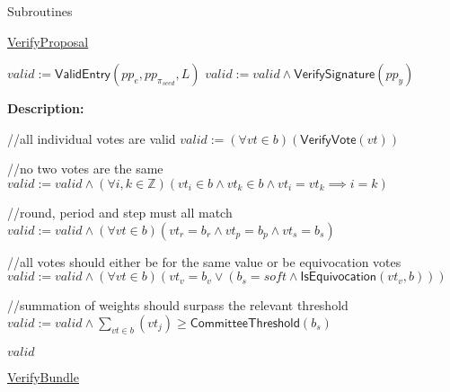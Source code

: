 \documentclass[10pt,a4paper]{article}
\begin{document}
\begin{section}{Subroutines}
\begin{algorithm}[H]
    \caption{\underline{VerifyProposal}}
    \label{algo:verify-proposal}
    \begin{algorithmic}[1]

    \State $valid := \mathsf{ValidEntry}(pp_e, pp_{\pi_{seed}}, L)$
    \State $valid := valid \land \mathsf{VerifySignature}(pp_y)$

    \EndFunction
    \end{algorithmic}
\end{algorithm}

\noindent \textbf{Description:}\\


\begin{algorithm}[H]\label{algo:verify-bundle}
    \begin{algorithmic}[1]

    //all individual votes are valid
    \State $valid := (\forall vt \in b)(\mathsf{VerifyVote}(vt))$
    
    //no two votes are the same
    \State $valid := valid \land (\forall i,k \in \mathbb{Z})(vt_i \in b \land vt_k \in b \land vt_i = vt_k \implies i=k)$

    //round, period and step must all match
    \State $valid := valid \land (\forall vt \in b)(vt_r = b_r \land vt_p = b_p \land vt_s = b_s)$
  
    //all votes should either be for the same value or be equivocation votes
    \State $valid := valid \land (\forall vt \in b)(vt_v = b_v \lor (b_s = soft \land \mathsf{IsEquivocation}(vt_v, b)))$

    //summation of weights should surpass the relevant threshold
    \State $valid := valid \land  \sum_{vt \in b}(vt_j) \geq \mathsf{CommitteeThreshold}(b_s)$

    \Return $valid$

    \EndFunction
    \end{algorithmic}
    \caption{\underline{VerifyBundle}}
\end{algorithm}


\end{section}
\end{document}
